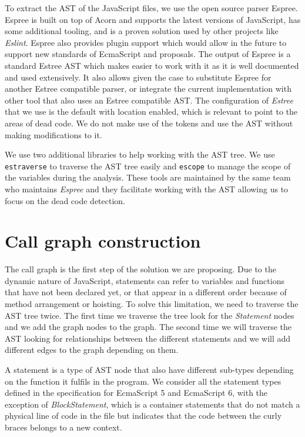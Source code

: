 \documentclass{uvamscse}
\begin{document}
To extract the AST of the JavaScript files, we use the open source parser Espree. Espree is built on top of Acorn and supports the latest versions of JavaScript, has some additional tooling, and is a proven solution used by other projects like \textit{Eslint}. Espree also provides plugin support which would allow in the future to support new standards of EcmaScript and proposals. The output of Espree is a standard Estree AST which makes easier to work with it as it is well documented and used extensively. It also allows given the case to substitute Espree for another Estree compatible parser, or integrate the current implementation with other tool that also uses an Estree compatible AST. The configuration of \textit{Estree} that we use is the default with location enabled, which is relevant to point to the areas of dead code. We do not make use of the tokens and use the AST without making modifications to it.

We use two additional libraries to help working with the AST tree. We use \texttt{estraverse} to traverse the AST tree easily and \texttt{escope} to manage the scope of the variables during the analysis. These tools are maintained by the same team who maintains \textit{Espree} and they facilitate working with the AST allowing us to focus on the dead code detection.

\section{Call graph construction}
The call graph is the first step of the solution we are proposing. Due to the dynamic nature of JavaScript, statements can refer to variables and functions that have not been declared yet, or that appear in a different order because of method arrangement or hoisting. To solve this limitation, we need to traverse the AST tree twice. The first time we traverse the tree look for the \textit{Statement} nodes and we add the graph nodes to the graph. The second time we will traverse the AST looking for relationships between the different statements and we will add different edges to the graph depending on them.

A statement is a type of AST node that also have different sub-types depending on the function it fulfils in the program. We consider all the statement types defined in the specification for EcmaScript 5 and EcmaScript 6, with the exception of \textit{BlockStatement}, which is a container statements that do not match a physical line of code in the file but indicates that the code between the curly braces belongs to a new context.
\end{document}

